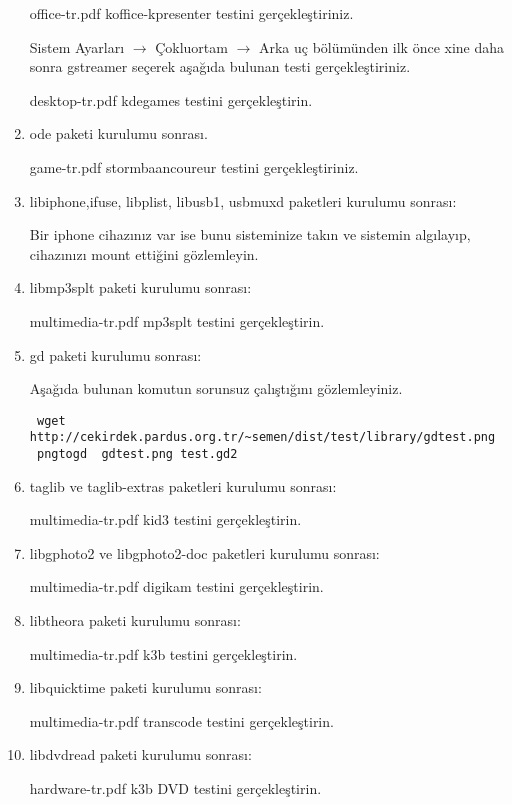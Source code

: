 \documentclass[a4paper,10pt]{article}
\begin{document}
\begin{enumerate}
office-tr.pdf koffice-kpresenter testini gerçekleştiriniz.

Sistem Ayarları $\rightarrow$ Çokluortam $\rightarrow$ Arka uç bölümünden ilk önce xine daha sonra gstreamer seçerek aşağıda bulunan testi gerçekleştiriniz.

desktop-tr.pdf kdegames testini gerçekleştirin.
\item ode paketi kurulumu sonrası.

game-tr.pdf stormbaancoureur testini gerçekleştiriniz.

\item libiphone,ifuse, libplist, libusb1, usbmuxd paketleri kurulumu sonrası:

Bir iphone cihazınız var ise bunu sisteminize takın ve sistemin algılayıp, cihazınızı mount ettiğini gözlemleyin.

\item libmp3splt paketi kurulumu sonrası:

multimedia-tr.pdf mp3splt testini gerçekleştirin.

\item gd paketi kurulumu sonrası:

Aşağıda bulunan komutun sorunsuz çalıştığını gözlemleyiniz.

\begin{verbatim}
 wget http://cekirdek.pardus.org.tr/~semen/dist/test/library/gdtest.png
 pngtogd  gdtest.png test.gd2
\end{verbatim}

\item taglib ve taglib-extras paketleri kurulumu sonrası:

multimedia-tr.pdf kid3 testini gerçekleştirin.

\item libgphoto2 ve libgphoto2-doc paketleri kurulumu sonrası:

multimedia-tr.pdf digikam testini gerçekleştirin.

\item libtheora paketi kurulumu sonrası:

multimedia-tr.pdf k3b testini gerçekleştirin.

\item libquicktime paketi kurulumu sonrası:

multimedia-tr.pdf transcode testini gerçekleştirin.

\item libdvdread paketi kurulumu sonrası:

hardware-tr.pdf k3b DVD testini gerçekleştirin.


\end{enumerate}
\end{document}
